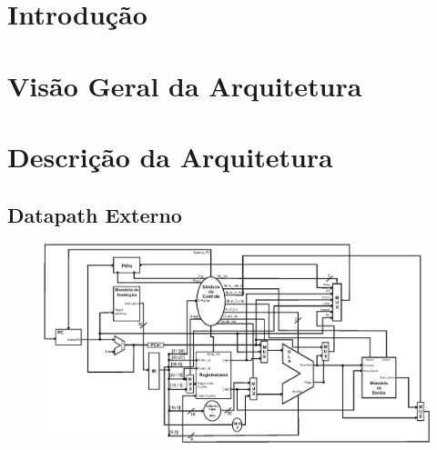 \documentclass{report}
\begin{document}
\tableofcontents

\chapter{Introdução}
  
	

\chapter{Visão Geral da Arquitetura}

%	
	
	
	
	

\chapter{Descrição da Arquitetura}

	
	\newpage
	
	\newpage
		
	\newpage
	
	\newpage
	\begin{landscape}
	\section{Datapath Externo}
	\begin{figure}[H]
    	\includegraphics{./datapath/datapath_final-1.eps}
  	\end{figure}
  	\end{landscape}

% 
% 
\end{document}
